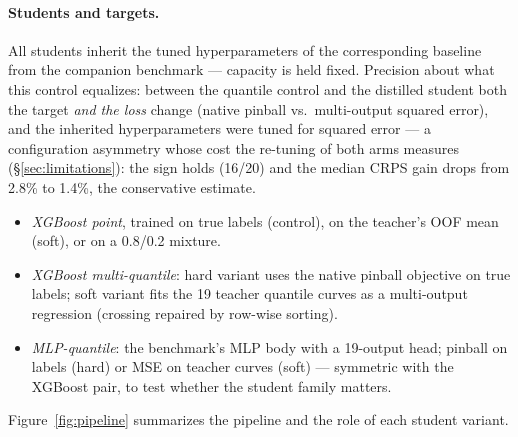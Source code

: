 \documentclass[11pt]{article}
\begin{document}
\paragraph{Students and targets.} All students inherit the tuned
hyperparameters of the corresponding baseline from the companion benchmark
--- capacity is held fixed. Precision about what this control equalizes:
between the quantile control and the distilled student both the target
\emph{and the loss} change (native pinball vs.\ multi-output squared
error), and the inherited hyperparameters were tuned for squared error
--- a configuration asymmetry whose cost the re-tuning of both arms
measures (\S\ref{sec:limitations}): the sign holds (16/20) and the median
CRPS gain drops from 2.8\% to 1.4\%, the conservative estimate.
\begin{itemize}
  \item \emph{XGBoost point}, trained on true labels (control), on the
    teacher's OOF mean (soft), or on a 0.8/0.2 mixture.
  \item \emph{XGBoost multi-quantile}: hard variant uses the native pinball
    objective on true labels; soft variant fits the 19 teacher quantile
    curves as a multi-output regression (crossing repaired by row-wise
    sorting).
  \item \emph{MLP-quantile}: the benchmark's MLP body with a 19-output
    head; pinball on labels (hard) or MSE on teacher curves (soft) ---
    symmetric with the XGBoost pair, to test whether the student family
    matters.
\end{itemize}
Figure~\ref{fig:pipeline} summarizes the pipeline and the role of each
student variant.
\end{document}

